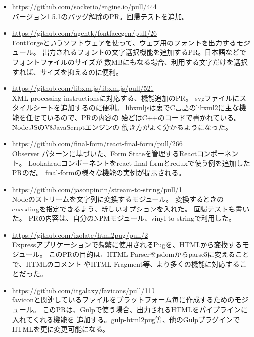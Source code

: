 \documentclass{res}
\begin{document}
\begin{resume}
\begin{itemize}
  \item \url{https://github.com/socketio/engine.io/pull/444} \\
  バージョン1.5.1のバッグ解除のPR。回帰テストを追加。

  \item \url{https://github.com/agentk/fontfacegen/pull/26} \\
  FontForgeというソフトウェアを使って、ウェブ用のフォントを出力するモジュール。
  出力されるフォントの文字選択機能を追加するPR。日本語などでフォントファイルのサイズが
  数MBにもなる場合、利用する文字だけを選択すれば、サイズを抑えるのに便利。

  \item \url{https://github.com/libxmljs/libxmljs/pull/521} \\
  XML processing instructionsに対応する、機能追加のPR。
  svgファイルにスタイルシートを追加するのに便利。
  libxmljsは裏でC言語のlibxml2に主な機能を任せているので、PRの内容の
  殆どはC++のコードで書かれている。Node.JSのV8JavaScriptエンジンの
  働き方がよく分かるようになった。

  \item \url{https://github.com/final-form/react-final-form/pull/266} \\
  Observer パターンに基づいた、Form Stateを管理するReactコンポーネント。
  Lookaheadコンポーネントをreact-final-formとreduxで使う例を追加したPRのだ。
  final-formの様々な機能の実例が提示される。

  \item \url{https://github.com/jasonpincin/stream-to-string/pull/1} \\
  Nodeのストリームを文字列に変換するモジュール。
  変換するときのencodingを指定できるよう、新しいオプションを入れた。
  回帰テストも書いた。
  PRの内容は、自分のNPMモジュール、vinyl-to-stringで利用した。

  \item \url{https://github.com/izolate/html2pug/pull/2} \\
  Expressアプリケーションで頻繁に使用されるPugを、HTMLから変換するモジュール。
  このPRの目的は、HTML Parserをjsdomからparse5に変えることで、HTMLのコメント
  やHTML Fragment等、より多くの機能に対応することだった。

  \item \url{https://github.com/itgalaxy/favicons/pull/110} \\
  faviconと関連しているファイルをプラットフォーム毎に作成するためのモジュール。
  このPRは、Gulpで使う場合、出力されるHTMLをパイプラインに入れてくれる機能を
  追加する。gulp-html2pug等、他のGulpプラグインでHTMLを更に変更可能になる。


\end{itemize}
\end{resume}
\end{document}
